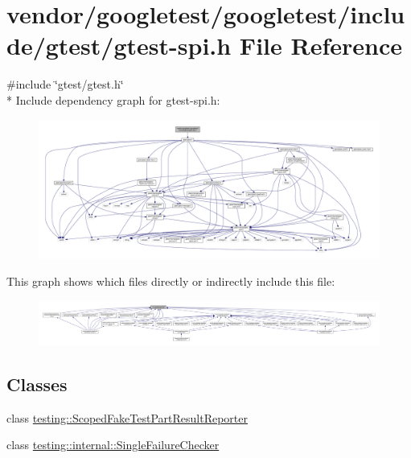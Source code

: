 \hypertarget{gtest-spi_8h}{}\section{vendor/googletest/googletest/include/gtest/gtest-\/spi.h File Reference}
\label{gtest-spi_8h}
{\ttfamily \#include \char`\"{}gtest/gtest.\+h\char`\"{}}\\*
Include dependency graph for gtest-\/spi.h\+:\nopagebreak
\begin{figure}[H]
\begin{center}
\leavevmode
\includegraphics[width=350pt]{gtest-spi_8h__incl}
\end{center}
\end{figure}
This graph shows which files directly or indirectly include this file\+:\nopagebreak
\begin{figure}[H]
\begin{center}
\leavevmode
\includegraphics[width=350pt]{gtest-spi_8h__dep__incl}
\end{center}
\end{figure}
\subsection*{Classes}
\begin{DoxyCompactItemize}
\item 
class \hyperlink{classtesting_1_1ScopedFakeTestPartResultReporter}{testing\+::\+Scoped\+Fake\+Test\+Part\+Result\+Reporter}
\item 
class \hyperlink{classtesting_1_1internal_1_1SingleFailureChecker}{testing\+::internal\+::\+Single\+Failure\+Checker}
\end{DoxyCompactItemize}
